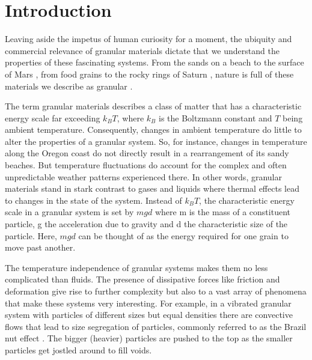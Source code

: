 \chapter{Introduction}

Leaving aside the impetus of human curiosity for a moment, the ubiquity and commercial relevance of granular materials dictate that we understand the properties of these fascinating systems. From the sands on a beach \cite{schiffer_granular_2005} to the surface of Mars \cite{mars_and_moon}, from food grains to the rocky rings of Saturn \cite{brilliantov_size_2015, saturn_2017}, nature is full of these materials we describe as granular \cite{duran_sands_2000, jaeger_granular_1996}. 

The term granular materials describes a class of matter that has a characteristic energy scale far exceeding $k_{B}T$, where $k_{B}$ is the Boltzmann constant and $T$ being ambient temperature. Consequently, changes in ambient temperature do little to alter the properties of a granular system. So, for instance, changes in temperature along the Oregon coast do not directly result in a rearrangement of its sandy beaches. But temperature fluctuations do account for the complex and often unpredictable weather patterns experienced there. In other words, granular materials stand in stark contrast to gases and liquids where thermal effects lead to changes in the state of the system. Instead of $k_{B}T$, the characteristic energy scale in a granular system is set by $mgd$ where m is the mass of a constituent particle, g the acceleration due to gravity and d the characteristic size of the particle. Here, $mgd$ can be thought of as the energy required for one grain to move past another. 

The temperature independence of granular systems makes them no less complicated than fluids. The presence of dissipative forces like friction and deformation give rise to further complexity but also to a vast array of phenomena that make these systems very interesting. For example, in a vibrated granular system with particles of different sizes but equal densities there are convective flows that lead to size segregation of particles, commonly referred to as the Brazil nut effect \cite{rosato, hong}. The bigger (heavier) particles are pushed to the top as the smaller particles get jostled around to fill voids. 

